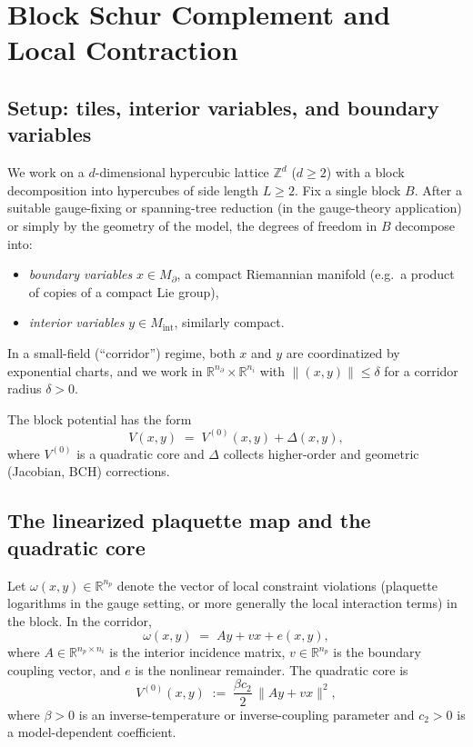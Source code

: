 \documentclass[11pt]{article}
\theoremstyle{definition}
\newcommand{\1}{\mathbf{1}}
\newcommand{\R}{\mathbb{R}}
\newcommand{\Z}{\mathbb{Z}}
\newcommand{\norm}[1]{\lVert #1\rVert}
\begin{document}
\section{Block Schur Complement and Local Contraction}\label{sec:schur}

\subsection{Setup: tiles, interior variables, and boundary variables}

We work on a $d$-dimensional hypercubic lattice $\Z^d$ ($d\ge 2$) with a block decomposition
into hypercubes of side length $L\ge 2$.  Fix a single block $B$.  After a suitable
gauge-fixing or spanning-tree reduction (in the gauge-theory application) or simply by the
geometry of the model, the degrees of freedom in $B$ decompose into:
\begin{itemize}[nosep]
\item \emph{boundary variables} $x\in M_\partial$, a compact Riemannian manifold (e.g.\ a product of copies of a compact Lie group),
\item \emph{interior variables} $y\in M_{\mathrm{int}}$, similarly compact.
\end{itemize}

In a small-field (``corridor'') regime, both $x$ and $y$ are coordinatized by exponential
charts, and we work in $\R^{n_\partial}\times\R^{n_i}$ with $\norm{(x,y)}\le\delta$ for a
corridor radius $\delta>0$.

The block potential has the form
\begin{equation}\label{eq:Vfull}
V(x,y) \;=\; V^{(0)}(x,y) + \Delta(x,y),
\end{equation}
where $V^{(0)}$ is a quadratic core and $\Delta$ collects higher-order and geometric
(Jacobian, BCH) corrections.

\subsection{The linearized plaquette map and the quadratic core}

Let $\omega(x,y)\in\R^{n_p}$ denote the vector of local constraint violations (plaquette
logarithms in the gauge setting, or more generally the local interaction terms) in the block.
In the corridor,
\begin{equation}\label{eq:omega}
\omega(x,y) \;=\; Ay + vx + e(x,y),
\end{equation}
where $A\in\R^{n_p\times n_i}$ is the interior incidence matrix, $v\in\R^{n_p}$ is the
boundary coupling vector, and $e$ is the nonlinear remainder.  The quadratic core is
\begin{equation}\label{eq:V0}
V^{(0)}(x,y) \;:=\; \frac{\beta c_2}{2}\,\norm{Ay+vx}^2,
\end{equation}
where $\beta>0$ is an inverse-temperature or inverse-coupling parameter and $c_2>0$ is a
model-dependent coefficient.
\end{document}
